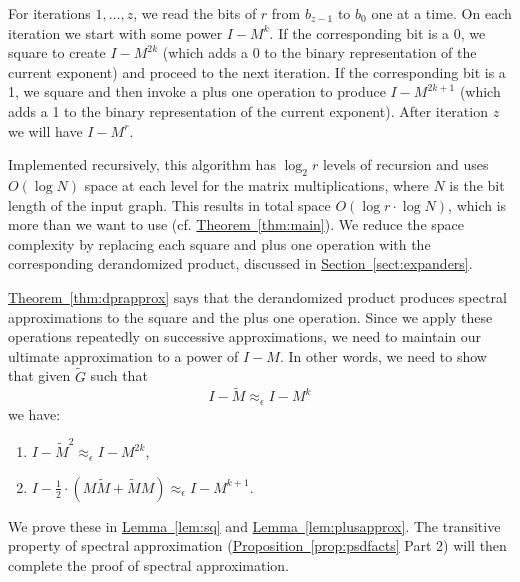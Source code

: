 \documentclass[11pt]{article}
\numberwithin{equation}{section}
\theoremstyle{definition}
\theoremstyle{plain}
\newcommand{\expref}[2]{\hyperref[#2]{#1~\ref{#2}}}
\newcommand{\wt}{\widetilde}   %
\numberwithin{myalgctr}{section}
\theoremstyle{named}
\begin{document}
For iterations $1,\ldots, z$, we read the bits of $r$ from $b_{z-1}$ to $b_{0}$ one at a time. On each iteration we start with some power $I-M^k$. If the corresponding bit is a 0, we square to create $I-M^{2k}$ (which adds a 0 to the binary representation of the current exponent) and proceed to the next iteration. If the corresponding bit is a 1, we square and then invoke a plus one operation to produce $I-M^{2k+1}$ (which adds a 1 to the binary representation of the current exponent). After iteration $z$ we will have $I-M^r$.

Implemented recursively, this algorithm has $\log_2 r$ levels of recursion and uses $O(\log N)$ space at each level for the matrix multiplications, where $N$ is the bit length of the input graph. This results in total space $O(\log r\cdot \log N)$, which is more than we want to use (cf. \expref{Theorem}{thm:main}). We reduce the space complexity by replacing each square and plus one operation with the corresponding derandomized product, discussed in \expref{Section}{sect:expanders}. 

\expref{Theorem}{thm:dprapprox} says that the derandomized product produces spectral approximations to the square and the plus one operation. Since we apply these operations repeatedly on successive approximations, we need to maintain our ultimate approximation to a power of $I-M$. In other words, we need to show that given $\wt{G}$ such that
\[
  I-\wt{M}\approx_{\epsilon}I-M^k
\]
we have:
\begin{enumerate}
\item $I-\wt{M}^2 \approx_{\epsilon} I-M^{2k}$,
\item $I-\frac{1}{2}\cdot(M\wt{M}+\wt{M}M)\approx_{\epsilon} I-M^{k+1}$.
\end{enumerate}
We prove these in \expref{Lemma}{lem:sq} and \expref{Lemma}{lem:plusapprox}. The transitive property of spectral approximation (\expref{Proposition}{prop:psdfacts} Part 2) will then complete the proof of spectral approximation. 
\end{document}
